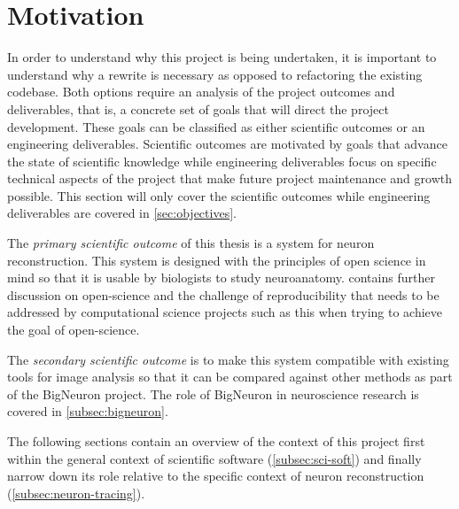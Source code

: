 \section{Motivation}\label{sec:motivation}

In order to understand why this project is being undertaken, it is
important to understand why a rewrite is necessary as opposed to refactoring
the existing codebase. Both options require an analysis of the project
outcomes and deliverables, that is, a concrete set of goals that will direct the project
development. These goals can be classified as either scientific
outcomes or an engineering deliverables. Scientific outcomes are motivated by goals that
advance the state of scientific knowledge while engineering deliverables focus
on specific technical aspects of the project that make future project
maintenance and growth possible. This section will only cover the scientific
outcomes while engineering deliverables are covered in \cref{sec:objectives}.

The \emph{primary scientific outcome} of this thesis is a system for
neuron reconstruction. This system is designed with the principles of open
science in mind so that it is usable by biologists to study
neuroanatomy.  contains further
discussion on open-science and the challenge of
reproducibility that needs to be addressed by computational science projects
such as this when trying to achieve the goal of open-science.

The \emph{secondary scientific outcome} is to make this system
compatible with existing tools for image analysis so that it can
be compared against other methods as part of the BigNeuron
project. The role of BigNeuron in neuroscience research is covered
in \cref{subsec:bigneuron}.

The following sections contain an overview of the context of this project
first within the general context of scientific software (\cref{subsec:sci-soft})
and finally narrow down its role relative to the specific context
of neuron reconstruction (\cref{subsec:neuron-tracing}).

